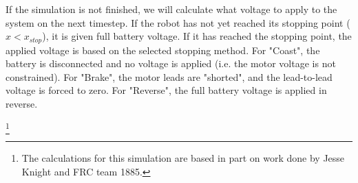 \documentclass[a4paper]{article}
\newcommand\blfootnote[1]{%
	\begingroup
	\renewcommand\thefootnote{}\footnote{#1}%
	\addtocounter{footnote}{-1}%
	\endgroup
}
\begin{document}
	If the simulation is not finished, we will calculate what voltage to apply to the system on the next timestep. If the robot has not yet reached its stopping point ($ x < x_{stop} $), it is given full battery voltage. If it has reached the stopping point, the applied voltage is based on the selected stopping method. For "Coast", the battery is disconnected and no voltage is applied (i.e. the motor voltage is not constrained). For "Brake", the motor leads are "shorted", and the lead-to-lead voltage is forced to zero. For "Reverse", the full battery voltage is applied in reverse.
	
	\blfootnote{The calculations for this simulation are based in part on work done by Jesse Knight and FRC team 1885.}
	
	
	
	
	
	
\end{document}
